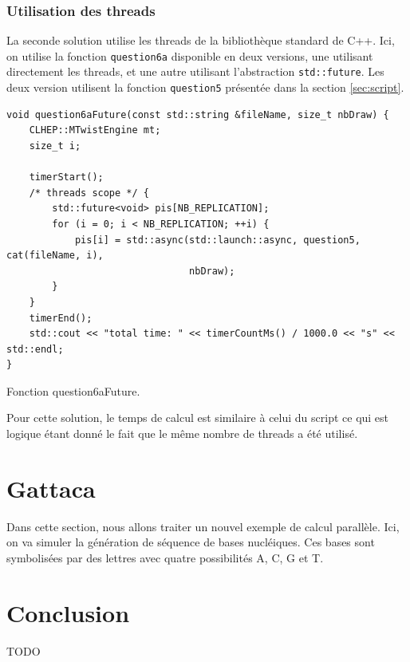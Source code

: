 \documentclass[a4paper]{article}
\begin{document}
\subsubsection{Utilisation des threads}

La seconde solution utilise les threads de la bibliothèque standard de C++. Ici,
on utilise la fonction \lstinline{question6a} disponible en deux versions, une
utilisant directement les threads, et une autre utilisant l'abstraction
\lstinline{std::future}. Les deux version utilisent la fonction
\lstinline{question5} présentée dans la section \ref{sec:script}.

\begin{listing}[ht!]
\begin{verbatim}
void question6aFuture(const std::string &fileName, size_t nbDraw) {
    CLHEP::MTwistEngine mt;
    size_t i;

    timerStart();
    /* threads scope */ {
        std::future<void> pis[NB_REPLICATION];
        for (i = 0; i < NB_REPLICATION; ++i) {
            pis[i] = std::async(std::launch::async, question5, cat(fileName, i),
                                nbDraw);
        }
    }
    timerEnd();
    std::cout << "total time: " << timerCountMs() / 1000.0 << "s" << std::endl;
}
\end{verbatim}
\caption{Fonction question6aFuture.}
\label{fn-q6}
\end{listing}

Pour cette solution, le temps de calcul est similaire à celui du script ce qui
est logique étant donné le fait que le même nombre de threads a été utilisé.

\section{Gattaca}

Dans cette section, nous allons traiter un nouvel exemple de calcul parallèle.
Ici, on va simuler la génération de séquence de bases nucléiques. Ces bases sont
symbolisées par des lettres avec quatre possibilités A, C, G et T.

\clearpage
\section{Conclusion}

TODO
\end{document}
